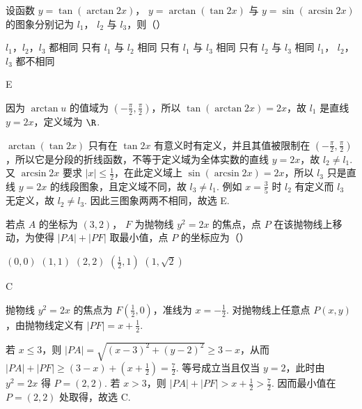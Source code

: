 \begin{problem}

设函数 \(y = \tan(\arctan 2x) \)， \(y = \arctan(\tan 2x) \) 与 \(y = \sin(\arcsin 2x) \) 的图象分别记为 \(l_1 \)， \(l_2 \) 与 \(l_3 \)，则（\quad）

\choicesfive
    {\(l_1 \)，\(l_2 \)，\(l_3 \) 都相同}
    {只有 \(l_1 \) 与 \(l_2 \) 相同}
    {只有 \(l_1 \) 与 \(l_3 \) 相同}
    {只有 \(l_2 \) 与 \(l_3 \) 相同}
    {\(l_1 \)， \(l_2 \)， \(l_3 \) 都不相同}
\end{problem}

\begin{answer}
E
\end{answer}

\begin{solution}
因为 \(\arctan u\) 的值域为 \((-\frac{\pi}{2},\frac{\pi}{2})\)，所以
\(\tan(\arctan2x)=2x\)，故 \(l_1\) 是直线 \(y=2x\)，定义域为 \(\R\).

\(\arctan(\tan2x)\) 只有在 \(\tan2x\) 有意义时有定义，并且其值被限制在 \((-\frac{\pi}{2},\frac{\pi}{2})\)，所以它是分段的折线函数，不等于定义域为全体实数的直线 \(y=2x\)，故 \(l_2\ne l_1\). 又 \(\arcsin2x\) 要求 \(|x|\leq\frac12\)，在此定义域上 \(\sin(\arcsin2x)=2x\)，所以 \(l_3\) 只是直线 \(y=2x\) 的线段图象，且定义域不同，故 \(l_3\ne l_1\). 例如 \(x=\frac35\) 时 \(l_2\) 有定义而 \(l_3\) 无定义，故 \(l_2\ne l_3\). 因此三图象两两不相同，故选 E.
\end{solution}

\begin{problem}

若点 \(A\) 的坐标为 \((3,2) \)， \(F\) 为抛物线 \(y^2 = 2x \) 的焦点，点 \(P\) 在该抛物线上移动，为使得 \(|PA| + |PF| \) 取最小值，点 \(P\) 的坐标应为（\quad）

\choicesfive
    {\((0,0) \)}
    {\((1,1) \)}
    {\((2,2) \)}
    {\(\left(\frac{1}{2},1\right) \)}
    {\((1,\sqrt{2})\)}
\end{problem}

\begin{answer}
C
\end{answer}

\begin{solution}
抛物线 \(y^2=2x\) 的焦点为 \(F(\frac12,0)\)，准线为 \(x=-\frac12\). 对抛物线上任意点 \(P(x,y)\)，由抛物线定义有 \(|PF|=x+\frac12\).

若 \(x\leq3\)，则
\(|PA|=\sqrt{(x-3)^2+(y-2)^2}\geq3-x\)，从而
\(|PA|+|PF|\geq(3-x)+(x+\frac12)=\frac72\).
等号成立当且仅当 \(y=2\)，此时由 \(y^2=2x\) 得 \(P=(2,2)\). 若 \(x>3\)，则 \(|PA|+|PF|>x+\frac12>\frac72\). 因而最小值在 \(P=(2,2)\) 处取得，故选 C.
\end{solution}

